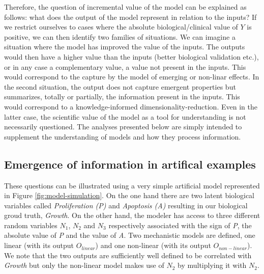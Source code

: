 \documentclass[a4paper,12pt,twoside,onecolumn,openright,final,oldfontcommands]{memoir}
\begin{document}
Therefore, the question of incremental value of the model can be
explained as follows: what does the output of the model represent in
relation to the inputs? If we restrict ourselves to cases where the
absolute biological/clinical value of \(Y\) is positive, we can then
identify two families of situations. We can imagine a situation where
the model has improved the value of the inputs. The outputs would then
have a higher value than the inputs (better biological validation etc.),
or in any case a complementary value, a value not present in the inputs.
This would correspond to the capture by the model of emerging or
non-linar effects. In the second situation, the output does not capture
emergent properties but summarizes, totally or partially, the
information present in the inputs. This would correspond to a
knowledge-informed dimensionality-reduction. Even in the latter case,
the scientific value of the model as a tool for understanding is not
necessarily questioned. The analyses presented below are simply intended
to supplement the understanding of models and how they process
information.

\subsection{Emergence of information in artifical
examples}\label{emergence-of-information-in-artifical-examples}

These questions can be illustrated using a very simple artificial model
represented in Figure \ref{fig:model-simulation}. On the one hand there
are two latent biological variables called \emph{Proliferation (P)} and
\emph{Apoptosis (A)} resulting in our biological groud truth,
\emph{Growth}. On the other hand, the modeler has access to three
different random variables \(N_1\), \(N_2\) and \(N_3\) respectively
associated with the sign of \emph{P}, the absolute value of \emph{P} and
the value of \emph{A}. Two mechanistic models are defined, one linear
(with its output \(O_{linear}\)) and one non-linear (with its output
\(O_{non-linear}\)). We note that the two outputs are sufficiently well
defined to be correlated with \emph{Growth} but only the non-linear
model makes use of \(N_2\) by multiplying it with \(N_2\).
\end{document}
